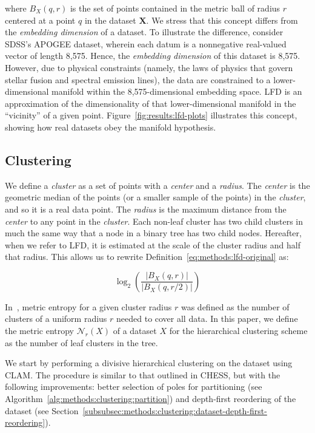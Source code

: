 where $B_X(q, r)$ is the set of points contained in the metric ball of radius $r$ centered at a point $q$ in the dataset $\textbf{X}$.
We stress that this concept differs from the \emph{embedding dimension} of a dataset.
To illustrate the difference, consider SDSS's APOGEE dataset, wherein each datum is a nonnegative real-valued vector of length 8,575.
Hence, the \emph{embedding dimension} of this dataset is 8,575. 
However, due to physical constraints (namely, the laws of physics that govern stellar fusion and spectral emission lines), the data are constrained to a lower-dimensional manifold within the 8,575-dimensional embedding space.
LFD is an approximation of the dimensionality of that lower-dimensional manifold in the ``vicinity'' of a given point.
Figure~\ref{fig:results:lfd-plots} illustrates this concept, showing how real datasets obey the manifold hypothesis.


\subsection{Clustering}
\label{subsec:methods:clustering}

We define a \emph{cluster} as a set of points with a \emph{center} and a \emph{radius}.
The \emph{center} is the geometric median of the points (or a smaller sample of the points) in the \emph{cluster}, and so it is a real data point.
The \emph{radius} is the maximum distance from the \emph{center} to any point in the \emph{cluster}.
Each non-leaf cluster has two child clusters in much the same way that a node in a binary tree has two child nodes.
Hereafter, when we refer to LFD, it is estimated at the scale of the cluster radius and half that radius. 
This allows us to rewrite Definition~\ref{eq:methods:lfd-original} as:

\begin{equation} 
    \log_2 \left( \frac{|B_X(q, r)|}{|B_X(q, r/2)|} \right)
    \label{eq:methods:lfd-simplified}
\end{equation}

In~\cite{yu2015entropy}, metric entropy for a given cluster radius $r$ was defined as the number of clusters of a uniform radius $r$ needed to cover all data.
In this paper, we define the metric entropy $\mathcal{N}_{\hat{r}}(X)$ of a dataset $X$ for the hierarchical clustering scheme as the number of leaf clusters in the tree.

We start by performing a divisive hierarchical clustering on the dataset using CLAM.
The procedure is similar to that outlined in CHESS, but with the following improvements:
better selection of poles for partitioning (see Algorithm~\ref{alg:methods:clustering:partition}) and depth-first reordering of the dataset (see Section~\ref{subsubsec:methods:clustering:dataset-depth-first-reordering}). 

